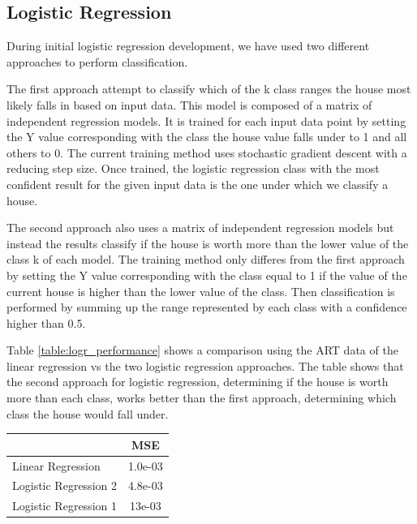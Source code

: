 \documentclass[10pt]{article}
\begin{document}
\begin{multicols}{2}
		\subsection{Logistic Regression}
		During initial logistic regression development, we have used two different approaches to perform classification.

		The first approach attempt to classify which of the k class ranges the house most likely falls in based on input data. This model is composed of a matrix of independent regression models. It is trained for each input data point by setting the Y value corresponding with the class the house value falls under to 1 and all others to 0. The current training method uses stochastic gradient descent with a reducing step size. Once trained, the logistic regression class with the most confident result for the given input data is the one under which we classify a house.

	 	The second approach also uses a matrix of independent regression models but instead the results classify if the house is worth more than the lower value of the class k of each model. The training method only differes from the first approach by setting the Y value corresponding with the class equal to 1 if the value of the current house is higher than the lower value of the class. Then classification is performed by summing up the range represented by each class with a confidence higher than 0.5.

 		Table \ref{table:logr_performance} shows a comparison using the ART data of the linear regression vs the two logistic regression approaches. The table shows that the second approach for logistic regression, determining if the house is worth more than each class, works better than the first approach, determining which class the house would fall under.
		\begin{center}
	        \captionsetup{type=table}
			\begin{tabular}{l|c}
				& \small{MSE} \\
				\hline
				\small{Linear Regression} & \small{1.0e-03} \\
				\hline
				\small{Logistic Regression 2} & \small{4.8e-03} \\
				\hline
				\small{Logistic Regression 1} & \small{13e-03} \\
				\hline
			\end{tabular}
			\label{table:logr_performance}        
			\setlength{\parindent}{15pt}
		\end{center}
	

\end{multicols}
\end{document}
